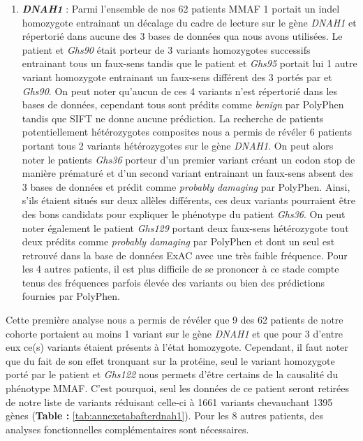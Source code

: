 \documentclass[12pt,twoside]{reedthesis}
\providecommand{\tightlist}{%
  \setlength{\itemsep}{0pt}\setlength{\parskip}{0pt}}
\theoremstyle{definition}
\theoremstyle{definition}
\theoremstyle{remark}
\begin{document}
  \begin{enumerate}
  \def\labelenumi{\arabic{enumi}.}
  \tightlist
  \item
    \textbf{\emph{DNAH1}} : Parmi l'ensemble de nos 62 patients MMAF 1
    portait un indel homozygote entrainant un décalage du cadre de lecture
    sur le gène \emph{DNAH1} et répertorié dans aucune des 3 bases de
    données qua nous avons utilisées. Le patient et \emph{Ghs90} était
    porteur de 3 variants homozygotes successifs entrainant tous un
    faux-sens tandis que le patient et \emph{Ghs95} portait lui 1 autre
    variant homozygote entrainant un faux-sens différent des 3 portés par
    et \emph{Ghs90}. On peut noter qu'aucun de ces 4 variants n'est
    répertorié dans les bases de données, cependant tous sont prédits
    comme \emph{benign} par PolyPhen tandis que SIFT ne donne aucune
    prédiction. La recherche de patients potentiellement hétérozygotes
    composites nous a permis de révéler 6 patients portant tous 2 variants
    hétérozygotes sur le gène \emph{DNAH1}. On peut alors noter le
    patients \emph{Ghs36} porteur d'un premier variant créant un codon
    stop de manière prématuré et d'un second variant entrainant un
    faux-sens absent des 3 bases de données et prédit comme \emph{probably
    damaging} par PolyPhen. Ainsi, s'ils étaient situés sur deux allèles
    différents, ces deux variants pourraient être des bons candidats pour
    expliquer le phénotype du patient \emph{Ghs36}. On peut noter
    également le patient \emph{Ghs129} portant deux faux-sens hétérozygote
    tout deux prédits comme \emph{probably damaging} par PolyPhen et dont
    un seul est retrouvé dans la base de données ExAC avec une très faible
    fréquence. Pour les 4 autres patients, il est plus difficile de se
    prononcer à ce stade compte tenus des fréquences parfois élevée des
    variants ou bien des prédictions fournies par PolyPhen.
  \end{enumerate}
  
  Cette première analyse nous a permis de révéler que 9 des 62 patients de
  notre cohorte portaient au moins 1 variant sur le gène \emph{DNAH1} et
  que pour 3 d'entre eux ce(s) variants étaient présents à l'état
  homozygote. Cependant, il faut noter que du fait de son effet tronquant
  sur la protéine, seul le variant homozygote porté par le patient et
  \emph{Ghs122} nous permets d'être certains de la causalité du phénotype
  MMAF. C'est pourquoi, seul les données de ce patient seront retirées de
  notre liste de variants réduisant celle-ci à 1661 variants chevauchant
  1395 gènes (\textbf{Table :} \ref{tab:annexetabafterdnah1}). Pour les 8
  autres patients, des analyses fonctionnelles complémentaires sont
  nécessaires.
  
\end{document}
